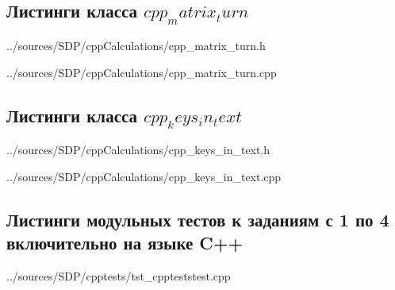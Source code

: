 \documentclass[12pt,a4paper]{report}
\begin{document}
\subsection*{Листинги класса $cpp_matrix_turn$}

{../sources/SDP/cppCalculations/cpp_matrix_turn.h}

{../sources/SDP/cppCalculations/cpp_matrix_turn.cpp}
\newpage

\subsection*{Листинги класса $cpp_keys_in_text$}

{../sources/SDP/cppCalculations/cpp_keys_in_text.h}

{../sources/SDP/cppCalculations/cpp_keys_in_text.cpp}
\newpage

\subsection*{Листинги модульных тестов к заданиям с 1 по 4 включительно на языке C++}

{../sources/SDP/cpptests/tst_cppteststest.cpp}
\newpage
\end{document}
